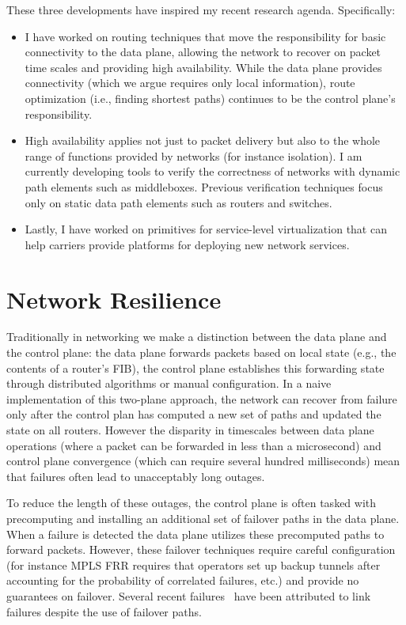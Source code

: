 \documentclass[letterpaper]{article}
\begin{document}
These three developments have inspired my recent research agenda. Specifically:
\begin{itemize}
    \item I have worked on routing techniques that move the responsibility for basic connectivity to the data plane,
        allowing the network to recover on packet time scales and providing high availability. While the data plane
        provides connectivity (which we argue requires only local information), route optimization (i.e., finding shortest paths) continues to be the
        control plane's responsibility.
    \item High availability applies not just to packet delivery but also to the whole range of functions provided by
        networks (for instance isolation). I am currently developing tools to verify the correctness of networks with
        dynamic path elements such as middleboxes. Previous verification techniques focus only on static data path
        elements such as routers and switches.
    \item Lastly, I have worked on primitives for service-level virtualization that can help carriers provide platforms
        for deploying new network services.
\end{itemize}

\section*{Network Resilience}
Traditionally in networking we make a distinction between the data plane and the control plane: the data plane forwards
packets based on local state (e.g., the contents of a router's FIB), the control plane establishes this forwarding state
through distributed algorithms or manual configuration. In a naive implementation of this two-plane approach, the
network can recover from failure only after the control plan has computed a new set of paths and updated the state on
all routers. However the disparity in timescales between data plane operations (where a packet can be forwarded in less
than a microsecond) and control plane convergence (which can require several hundred milliseconds) mean that failures
often lead to unacceptably long outages.

To reduce the length of these outages, the control plane is often tasked with precomputing and installing an additional
set of failover paths in the data plane. When a failure is detected the data plane utilizes these precomputed paths to
forward packets. However, these failover techniques require careful configuration (for instance MPLS FRR requires that
operators set up backup tunnels after accounting for the probability of correlated failures, etc.) and provide no
guarantees on failover. Several recent failures~\cite{sprint2006, emea2008, wiki2012} have been attributed to link
failures despite the use of failover paths. 
\end{document}

